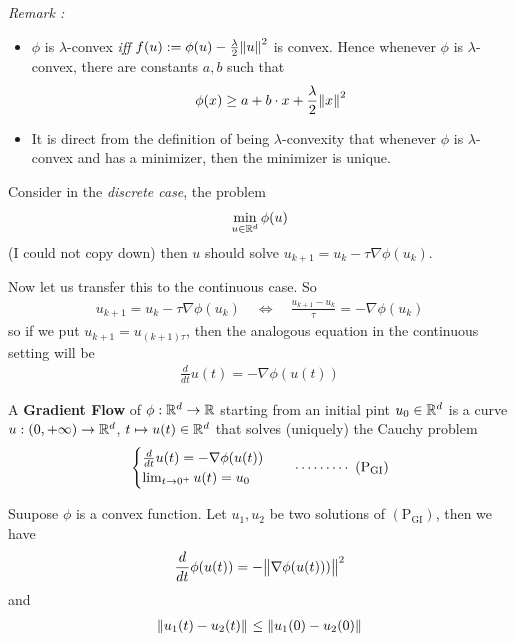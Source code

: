 \documentclass[12pt,a4paper]{article}
\begin{document}
\emph{Remark :}
\begin{itemize}
\item $\phi$ is $\lambda$-convex \emph{iff} $f(u) := \phi(u) - \frac{\lambda}{2} \snorms{u}{}^2$ is convex. Hence whenever $\phi$ is $\lambda$-convex, there are constants $a,b$ such that
\begin{align*}
\phi(x) \geq a+ b\cdot x + \frac{\lambda}{2} \snorms{x}{}^2
\end{align*}
\item It is direct from the definition of being $\lambda$-convexity that whenever $\phi$ is $\lambda$-convex and has a minimizer, then the minimizer is unique.
\end{itemize} 
\s

Consider in the \emph{discrete case}, the problem
\begin{align*}
\min_{u\in \mathbb{R}^d} \phi(u)
\end{align*}
(I could not copy down) then $u$ should solve $u_{k+1} = u_k - \tau \nabla \phi(u_k)$.
\s

Now let us transfer this to the continuous case. So
\begin{align*}
u_{k+1} = u_k - \tau \nabla \phi(u_k) \quad \Leftrightarrow \quad \frac{u_{k+1} - u_k}{\tau} = - \nabla \phi(u_k)
\end{align*}
so if we put $u_{k+1} = u_{(k+1)\tau}$, then the analogous equation in the continuous setting will be
\begin{align*}
\frac{d}{dt} u(t) = - \nabla \phi(u(t))
\end{align*}
\s

 A \textbf{Gradient Flow} of $\phi : \mathbb{R}^d \rightarrow \mathbb{R}$ starting from an initial pint $u_0 \in \mathbb{R}^d$ is a curve $u: (0, +\infty) \rightarrow \mathbb{R}^d$, $t \mapsto u(t) \in \mathbb{R}^d$ that solves (uniquely) the Cauchy problem
\begin{align*}
\begin{cases}
\frac{d}{dt} u(t) = - \nabla \phi(u(t)) \\
\lim_{t\rightarrow 0^+} u(t) = u_0 
\end{cases} \quad \cdots\cdots\cdots\,\,(\text{P}_{\text{GI}})
\end{align*}
\s

\renewcommand{\pgi}{\text{P}_{\text{GI}}}

 Suupose $\phi$ is a convex function. Let $u_1, u_2$ be two solutions of $(\pgi)$, then we have
\begin{align*}
\frac{d}{dt} \phi(u(t)) = -\bigl\lVert\nabla \phi(u(t)))\bigr\rVert_{}^2
\end{align*}
and
\begin{align*}
\snorms{u_1(t) - u_2(t)}{} \leq \snorms{u_1(0)- u_2(0)}{}
\end{align*}
\end{document}

